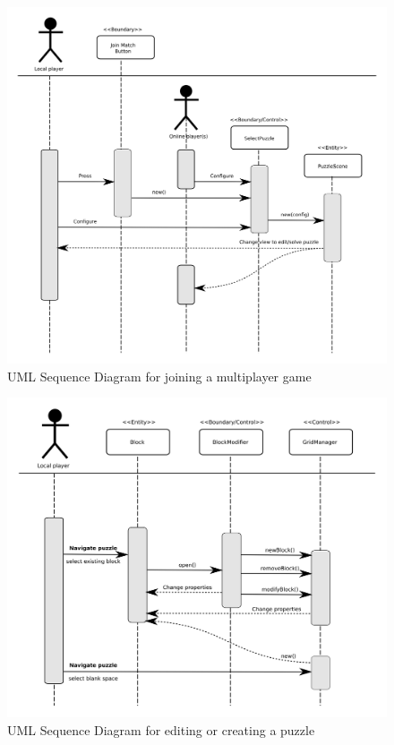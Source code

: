 \documentclass[12pt]{article}
\begin{document}
    \begin{figure}[H]
        \centering
        \includegraphics[width=6in]{sequence_join_match.png}
        \caption{UML Sequence Diagram for joining a multiplayer game}
    \end{figure}


    \begin{figure}[H]
        \centering
        \includegraphics[width=6in]{sequence_edit.png}
        \caption{UML Sequence Diagram for editing or creating a puzzle}
    \end{figure}
\end{document}
